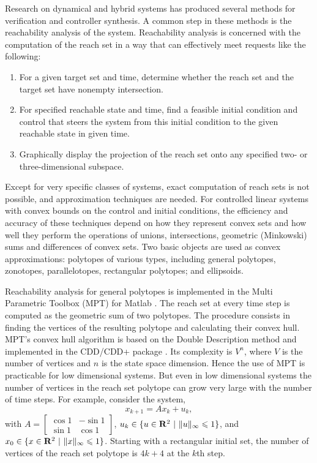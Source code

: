 Research on dynamical and hybrid systems has produced several methods
for verification and controller synthesis.
A common step in these methods is the reachability analysis of the system.
Reachability analysis is concerned with the  computation of the reach set
in  a way that can effectively meet requests like the following:
\begin{enumerate}
\item For a given target set and time, determine whether
the reach set and the target set have nonempty intersection.
\item For specified reachable state and time,
find a feasible initial condition and control that steers the system
from this initial condition to the given reachable state in given time.
\item Graphically display the projection of the reach set onto
any specified two- or three-dimensional subspace.
\end{enumerate}
Except for very specific classes of systems, exact computation of reach sets is
not possible, and approximation techniques are needed.
For controlled linear systems with convex bounds on the control
and initial conditions, the efficiency and accuracy of these techniques depend
on how they represent convex sets and how well they perform the operations
of unions, intersections, geometric (Minkowski) sums and differences
of convex sets.
Two basic objects are used as convex approximations:
polytopes of various types, including general polytopes, zonotopes,
parallelotopes, rectangular polytopes; and ellipsoids.

Reachability analysis for general polytopes is implemented in the
Multi Parametric Toolbox (MPT) for Matlab \cite{KVASNICA_GRIEDER_BAOTIC_MORARI_HYBRID_SYSTEMS_COMPUTATION_AND_CONTROL, MULTI_PARAMETRIC_TOOLBOX_HOMEPAGE}.
The reach set at every time step is computed as the geometric sum
of two polytopes. The procedure consists in finding the vertices
of the resulting polytope and calculating their convex hull.
MPT's convex hull algorithm is based on the Double Description
method \cite{MOTZKIN_RAIFFA_THOMPSON_THRALL_DOUBLE_DESCRIPTION_METHOD} and implemented in the CDD/CDD+ package \cite{CDD_HOMEPAGE}.
Its complexity is $V^n$, where $V$ is the number of vertices and $n$ is the
state space dimension. Hence the use of MPT is practicable for low dimensional
systems. But even in low dimensional systems the number of vertices in
the reach set polytope can grow very large with the number
of time steps. For example, consider the  system,
\[ x_{k+1} = Ax_k + u_k ,\]
with $A=\left[\begin{array}{cc}
\cos 1 & -\sin 1\\
\sin 1 & \cos 1\end{array}\right]$,
$u_k \in \{u\in {\bf R}^2 ~|~ \|u\|_{\infty}\leq 1\}$, and
$x_0 \in \{x\in {\bf R}^2 ~|~ \|x\|_{\infty}\leq 1\}$. Starting with a
rectangular initial set, the number of vertices of the reach set polytope
is $4k + 4$ at the $k$th step.

